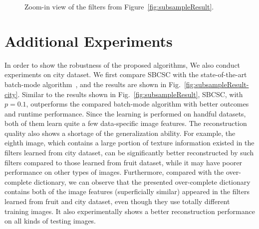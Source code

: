 \begin{figure}[h]
\begin{subfigure}{0.49\textwidth}
  \end{subfigure}
\caption{Zoom-in view of the filters from Figure~\ref{fig:subsampleResult}.}
\end{figure}


\section{Additional Experiments}
In order to show the robustness of the proposed algorithms, We also conduct experiments on city dataset. We first compare SBCSC with the state-of-the-art batch-mode algorithm~\cite{heide2015fast}, and the results are shown in Fig.\ \ref{fig:subsampleResult-city}. Similar to the results shown in Fig.\ \ref{fig:subsampleResult}, SBCSC, with $p=0.1$, outperforms the compared batch-mode algorithm with better outcomes and runtime performance. Since the learning is performed on handful datasets, both of them learn quite a few data-specific image features. The reconstruction quality also shows a shortage of the generalization ability. For example, the eighth image, which contains a large portion of texture information existed in the filters learned from city dataset, can be significantly better reconstructed by such filters compared to those learned from fruit dataset, while it may have poorer performance on other types of images. Furthermore, compared with the over-complete dictionary, we can observe that the presented over-complete dictionary contains both of the image features (superficially similar) appeared in the filters learned from fruit and city dataset, even though they use totally different training images. It also experimentally shows a better reconstruction performance on all kinds of testing images.

